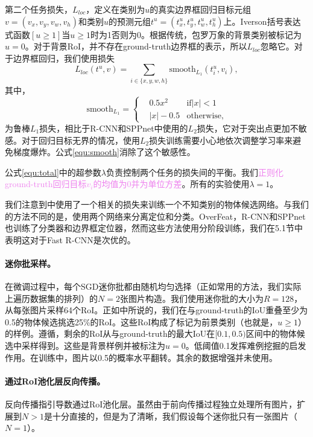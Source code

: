 \documentclass[../main]{subfile}
\begin{document}
第二个任务损失，$L_{loc}$，定义在类别为$u$的真实边界框回归目标元组$v=(v_x, v_y,v_w,v_h)$和类别$u$的预测元组$t^u=(t_x^u, t_y^u, t_w^u, t_h^u)$上。Iverson括号表达式函数$[u \ge 1]$当$u \ge1$时为1否则为0。根据传统，包罗万象的背景类别被标记为$u=0$。对于背景RoI，并不存在ground-truth边界框的表示，所以$L_{loc}$忽略它。对于边界框回归，我们使用损失
\begin{equation} \label{equ:loc}
    L_{loc}(t^u, v) = \sum_{i\in \{x, y,w,h\}}\text{smooth}_{L_1}(t_i^u, v_i),
\end{equation}
其中，
\begin{equation} \label{equ:smooth}
    \text{smooth}_{L_1} = \left\{
    \begin{aligned}
         & 0.5x^2    & \text{if} |x| < 1 \\
         & |x| - 0.5 & \text{otherwise,}
    \end{aligned}
    \right.
\end{equation}
为鲁棒$L_1$损失，相比于R-CNN和SPPnet中使用的$L_2$损失，它对于突出点更加不敏感。对于回归目标无界的情况，使用$L_2$损失训练需要小心地依次调整学习率来避免梯度爆炸。公式\ref{equ:smooth}消除了这个敏感性。

公式\ref{equ:total}中的超参数$\lambda$负责控制两个任务的损失间的平衡。我们\textcolor{violet}{正则化ground-truth回归目标$v_i$的均值为0并为单位方差}。所有的实验使用$\lambda=1$。

我们注意到\cite{6}中使用了一个相关的损失来训练一个不知类别的物体候选网络。与我们的方法不同的是，\cite{6}使用两个网络来分离定位和分类。OverFeat\cite{overfeat}，R-CNN\cite{rcnn}和SPPnet\cite{spp}也训练了分类器和边界框定位器，然而这些方法使用分阶段训练，我们在5.1节中表明这对于Fast R-CNN是次优的。

\paragraph{迷你批采样。}在微调过程中，每个SGD迷你批都由随机均匀选择（正如常用的方法，我们实际上遍历数据集的排列）的$N=2$张图片构造。我们使用迷你批的大小为$R=128$，从每张图片采样64个RoI。正如\cite{rcnn}中所说的，我们在与ground-truth的IoU重叠至少为0.5的物体候选挑选25\%的RoI。这些RoI构成了标记为前景类别（也就是，$u \ge 1$）的样例。遵循\cite{spp}，剩余的RoI从与ground-truth的最大IoU在$[0.1, 0.5)$区间中的物体候选中采样得到。这些是背景样例并被标注为$u=0$。低阈值0.1发挥难例挖掘的启发作用。在训练中，图片以0.5的概率水平翻转。其余的数据增强并未使用。

\paragraph{通过RoI池化层反向传播。}反向传播指引导数通过RoI池化层。虽然由于前向传播过程独立处理所有图片，扩展到$N>1$是十分直接的，但是为了清晰，我们假设每个迷你批只有一张图片（$N=1$）。
\end{document}
